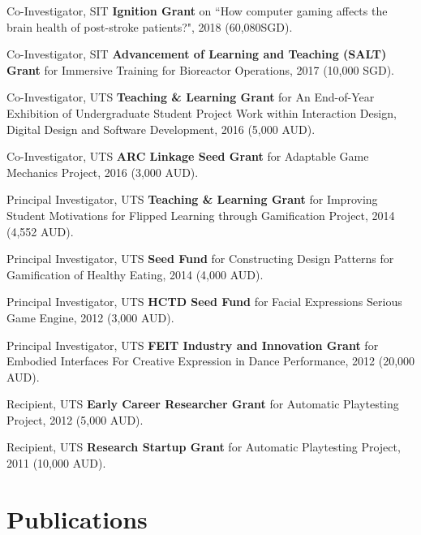 \documentclass[10pt,a4paper]{article}
\renewenvironment{itemize}{
    \begin{list}{}{
            \setlength{\leftmargin}{1.5em}
            \setlength{\itemsep}{0.25em}
            \setlength{\parskip}{0pt}
            \setlength{\parsep}{0.25em}
        }
        }{
    \end{list}
}
\begin{document}
\begin{itemize}
    \item Co-Investigator, SIT \textbf{Ignition Grant} on ``How computer gaming affects the brain health of post-stroke patients?", 2018 (60,080SGD).

    \item Co-Investigator, SIT \textbf{Advancement of Learning and Teaching (SALT) Grant} for Immersive Training for Bioreactor Operations, 2017 (10,000 SGD).

    \item Co-Investigator, UTS \textbf{Teaching \& Learning Grant} for An End-of-Year Exhibition of Undergraduate Student Project Work within Interaction Design, Digital Design and Software Development, 2016 (5,000 AUD).

    \item Co-Investigator, UTS \textbf{ARC Linkage Seed Grant} for Adaptable Game Mechanics Project, 2016 (3,000 AUD).

    \item Principal Investigator, UTS \textbf{Teaching \& Learning Grant} for Improving Student Motivations for Flipped Learning through Gamification Project, 2014 (4,552 AUD).

    \item Principal Investigator, UTS \textbf{Seed Fund} for Constructing Design Patterns for Gamification of Healthy Eating, 2014 (4,000 AUD).

    \item Principal Investigator, UTS \textbf{HCTD Seed Fund} for Facial Expressions Serious Game Engine, 2012 (3,000 AUD).

    \item Principal Investigator, UTS \textbf{FEIT Industry and Innovation Grant} for Embodied Interfaces For Creative Expression in Dance Performance, 2012 (20,000 AUD).

    \item Recipient, UTS \textbf{Early Career Researcher Grant} for Automatic Playtesting Project, 2012 (5,000 AUD).

    \item Recipient, UTS \textbf{Research Startup Grant} for Automatic Playtesting Project, 2011 (10,000 AUD).

\end{itemize}


\section*{Publications}
\end{document}
